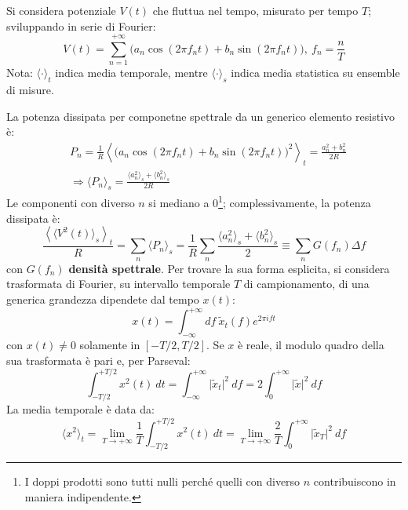 \documentclass[10pt, a4paper]{scrartcl}
\numberwithin{equation}{subsection}
\theoremstyle{style1}
\begin{document}
Si considera potenziale $V(t)$ che fluttua nel tempo, misurato per tempo $T$; sviluppando in serie di Fourier:
\begin{equation}
	V(t) = \sum_{n=1}^{+\infty} \big(a_n \cos(2 \pi f_n t) + b_n \sin (2\pi f_n t) \big), \ f_n = \frac{n}{T}
\end{equation}
Nota: $\langle \cdot  \rangle_t$ indica media temporale, mentre $\langle \cdot  \rangle_s$ indica media statistica su ensemble di misure.

La potenza dissipata per componetne spettrale da un generico elemento resistivo \`e:
\begin{equation}
	\begin{split}
		&P_n = \frac{1}{R} \left\langle \big(a_n \cos(2\pi f_n t) + b_n \sin(2\pi f_n t)\big)^2 \right\rangle_t = \frac{a_n^2 + b_n^2}{2R}\\
		&\Rightarrow \langle P_n \rangle_s = \frac{\langle a_n^2 \rangle_s + \langle b_n^2 \rangle_s}{2R}
	\end{split}
\end{equation}
Le componenti con diverso $n$ si mediano a $0$\footnote{I doppi prodotti sono tutti nulli perch\'e quelli con diverso $n$ contribuiscono in maniera indipendente.}; 
complessivamente, la potenza dissipata \`e:
\begin{equation}
	\frac{\left\langle \langle V^2(t) \rangle_s \right\rangle_t}{R} = \sum_{n}^{} \langle P_n \rangle_s = \frac{1}{R}\sum_{n}^{} \frac{\langle a_n^2 \rangle_s + \langle b_n^2 \rangle_s}{2} \equiv \sum_{n}^{} G(f_n) \Delta f
\end{equation}
con $G(f_n)$ \textbf{densit\`a spettrale}. 
Per trovare la sua forma esplicita, si considera trasformata di Fourier, su intervallo temporale $T$ di campionamento, di una generica grandezza dipendete dal tempo $x(t)$:
\begin{equation*}
	x(t) = \int_{-\infty} ^{+\infty} df \ \widetilde{x}_t (f) e^{2 \pi i f t} 
\end{equation*}
con $x(t) \neq 0$ solamente in $\left[ -T / 2, T / 2 \right] $.
Se $x$ \`e reale, il modulo quadro della sua trasformata \`e pari e, per Parseval:
\begin{equation*}
	\int_{-T / 2} ^{+T / 2} x^2 (t) \ dt = \int_{-\infty} ^{+\infty} \lvert \widetilde{x}_t \rvert ^2 \ df = 2 \int_{0} ^{+\infty} \lvert \widetilde{x} \rvert ^2 \ df
\end{equation*}
La media temporale \`e data da:
\[
\langle x^2 \rangle_t = \lim_{T \to +\infty} \frac{1}{ T } \int_{-T / 2} ^{+T / 2}  x^2 (t) \ dt = \lim_{T \to +\infty} \frac{2}{T} \int_{0} ^{+\infty} \lvert \widetilde{x}_T \rvert ^2 \ df
\] 
\end{document}
